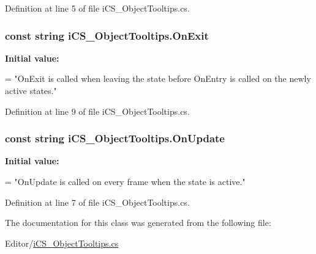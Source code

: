 Definition at line 5 of file i\+C\+S\+\_\+\+Object\+Tooltips.\+cs.

\hypertarget{classi_c_s___object_tooltips_a6fdcf49adf08d56db7aa6463284e20bf}{
\subsubsection[{On\+Exit}]{\setlength{\rightskip}{0pt plus 5cm}const string i\+C\+S\+\_\+\+Object\+Tooltips.\+On\+Exit}}\label{classi_c_s___object_tooltips_a6fdcf49adf08d56db7aa6463284e20bf}
{\bfseries Initial value\+:}
\begin{DoxyCode}
=
        \textcolor{stringliteral}{"OnExit is called when leaving the state before OnEntry is called on the newly active states."}
\end{DoxyCode}


Definition at line 9 of file i\+C\+S\+\_\+\+Object\+Tooltips.\+cs.

\hypertarget{classi_c_s___object_tooltips_a3b8ebc7f81ce5b2e316c366f811cf462}{
\subsubsection[{On\+Update}]{\setlength{\rightskip}{0pt plus 5cm}const string i\+C\+S\+\_\+\+Object\+Tooltips.\+On\+Update}}\label{classi_c_s___object_tooltips_a3b8ebc7f81ce5b2e316c366f811cf462}
{\bfseries Initial value\+:}
\begin{DoxyCode}
=
        \textcolor{stringliteral}{"OnUpdate is called on every frame when the state is active."}
\end{DoxyCode}


Definition at line 7 of file i\+C\+S\+\_\+\+Object\+Tooltips.\+cs.



The documentation for this class was generated from the following file\+:\begin{DoxyCompactItemize}
\item 
Editor/\hyperlink{i_c_s___object_tooltips_8cs}{i\+C\+S\+\_\+\+Object\+Tooltips.\+cs}\end{DoxyCompactItemize}
